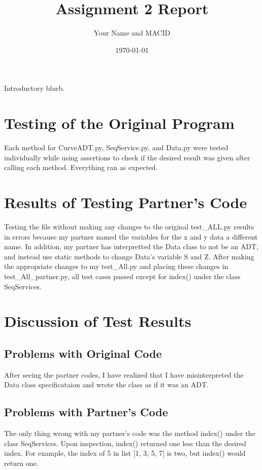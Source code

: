 \documentclass[12pt]{article}
\title{Assignment 2 Report}
\author{Your Name and MACID}
\date{\today}
\begin{document}
\maketitle

Introductory blurb.

\section{Testing of the Original Program}

Each method for CurveADT.py, SeqService.py, and Data.py were tested individually while using assertions to check if the desired result was given after calling each method. Everything ran as expected.

\section{Results of Testing Partner's Code}

Testing the file without making any changes to the original test\_ALL.py results in errors because my partner named the variables for the x and y data a different name. In addition, my partner has interpretted the Data class to not be an ADT, and instead use static methods to change Data's variable S and Z. After making the appropriate changes to my test\_All.py and placing these changes in test\_All\_partner.py, all test cases passed except for index() under the class SeqServices.

\section{Discussion of Test Results}

\subsection{Problems with Original Code}
After seeing the partner codes, I have realized that I have misinterpreted the Data class specificataion and wrote the class as if it was an ADT. 

\subsection{Problems with Partner's Code}
The only thing wrong with my partner's code was the method index() under the class SeqServices. Upon inspection, index() returned one less than the desired index. For example, the index of 5 in list [1, 3, 5, 7] is two, but index() would return one.
\end{document}
